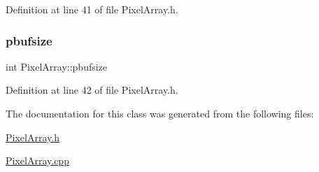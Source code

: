 Definition at line 41 of file Pixel\+Array.\+h.

\mbox{\label{class_pixel_array_aca29e70f9b643bff3733ab2e694439a1}} 
\subsubsection{\texorpdfstring{pbufsize}{pbufsize}}
{\footnotesize\ttfamily int Pixel\+Array\+::pbufsize\hspace{0.3cm}{\ttfamily [private]}}



Definition at line 42 of file Pixel\+Array.\+h.



The documentation for this class was generated from the following files\+:\begin{DoxyCompactItemize}
\item 
\hyperlink{_pixel_array_8h}{Pixel\+Array.\+h}\item 
\hyperlink{_pixel_array_8cpp}{Pixel\+Array.\+cpp}\end{DoxyCompactItemize}
